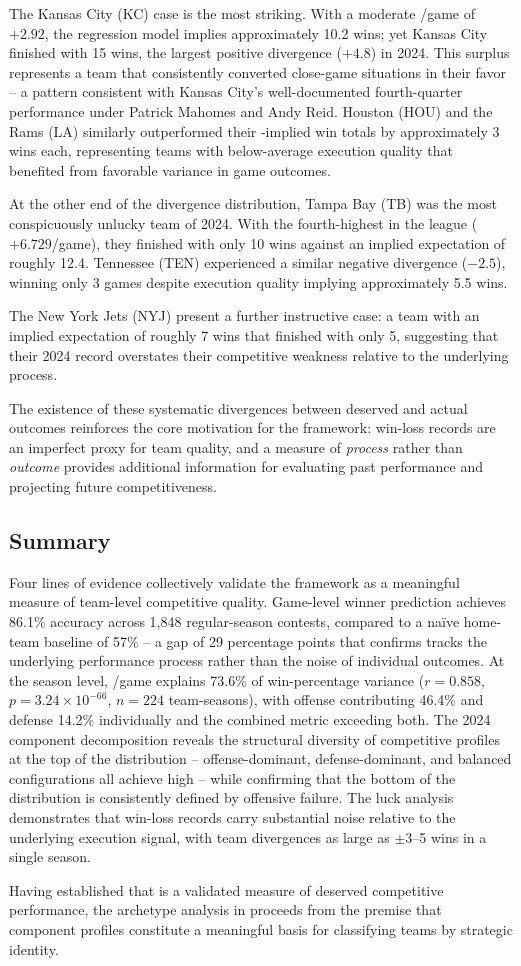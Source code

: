 The Kansas City (KC) case is the most striking. With a moderate \gds{}/game of
$+2.92$, the regression model implies approximately 10.2 wins; yet Kansas City
finished with 15 wins, the largest positive divergence ($+4.8$) in 2024. This
surplus represents a team that consistently converted close-game situations in
their favor -- a pattern consistent with Kansas City's well-documented
fourth-quarter performance under Patrick Mahomes and Andy Reid. Houston (HOU)
and the Rams (LA) similarly outperformed their \gds{}-implied win totals by
approximately 3 wins each, representing teams with below-average execution
quality that benefited from favorable variance in game outcomes.

At the other end of the divergence distribution, Tampa Bay (TB) was the most
conspicuously unlucky team of 2024. With the fourth-highest \gds{} in the
league ($+6.729$/game), they finished with only 10 wins against an implied
expectation of roughly 12.4. Tennessee (TEN) experienced a similar negative
divergence ($-2.5$), winning only 3 games despite execution quality
implying approximately 5.5 wins.

The New York Jets (NYJ) present a further instructive case: a team with an
implied expectation of roughly 7 wins that finished with only 5, suggesting
that their 2024 record overstates their competitive weakness relative to the
underlying process.

The existence of these systematic divergences between deserved and actual
outcomes reinforces the core motivation for the \gds{} framework: win-loss
records are an imperfect proxy for team quality, and a measure of
\emph{process} rather than \emph{outcome} provides additional information
for evaluating past performance and projecting future competitiveness.

\subsection{Summary}
\label{sec:gds-validation-summary}

Four lines of evidence collectively validate the \gds{} framework as a
meaningful measure of team-level competitive quality. Game-level winner
prediction achieves 86.1\% accuracy across 1{,}848 regular-season contests,
compared to a na\"{i}ve home-team baseline of 57\% -- a gap of 29 percentage
points that confirms \gds{} tracks the underlying performance process rather
than the noise of individual outcomes. At the season level, \gds{}/game
explains 73.6\% of win-percentage variance ($r = 0.858$, $p = 3.24 \times 10^{-66}$,
$n = 224$ team-seasons), with offense contributing 46.4\% and defense 14.2\%
individually and the combined metric exceeding both. The 2024 component
decomposition reveals the structural diversity of competitive profiles at the
top of the distribution -- offense-dominant, defense-dominant, and balanced
configurations all achieve high \gds{} -- while confirming that the bottom of
the distribution is consistently defined by offensive failure. The luck
analysis demonstrates that win-loss records carry substantial noise relative
to the underlying execution signal, with team divergences as large as $\pm 3$--5
wins in a single season.

Having established that \gds{} is a validated measure of deserved competitive
performance, the archetype analysis in  proceeds
from the premise that \gds{} component profiles constitute a meaningful basis
for classifying teams by strategic identity.
